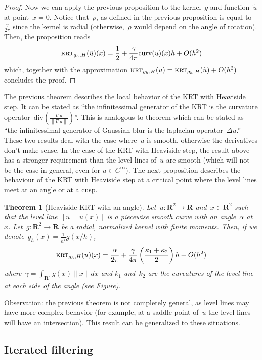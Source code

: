 \documentclass[12pt]{article}                  %
\newtheorem{theorem}{Theorem}
\begin{document}
\begin{proof}
	Now we can apply the previous proposition to the kernel~$g$ and
	function~$\tilde u$ at point~$x=0$.  Notice that~$\rho$, as defined in the
	previous proposition is equal to~$\frac{\gamma}{2\pi}$ since the kernel is
	radial (otherwise,~$\rho$ would depend on the angle of rotation).  Then, the
	proposition reads
	\[
		\textsc{krt}_{g_h,H}(\tilde
		u)(x)=\frac12+\frac{\gamma}{4\pi}\mathrm{curv}(u)(x)h + O(h^2)
	\]
	which, together with the approximation
	\(
		\textsc{krt}_{g_h,H}(u)=\textsc{krt}_{g_h,H}(\tilde u)+O(h^2)
	\)
	concludes the proof.
\end{proof}

The previous theorem %
describes the local behavior of the KRT with Heaviside step.
It can be stated as ``the infinitessimal generator of the KRT is the
curvature operator~$\mathrm{div}\left(\frac{\nabla u}{\left\|\nabla
u\right\|}\right)$''.
This is analogous to theorem  %
which can be stated as ``the infinitessimal generator of Gaussian blur is
the laplacian operator~$\Delta u$.''
These two results deal with the case where~$u$ is smooth, otherwise the
derivatives don't make sense.  In the case of the KRT with Heaviside step,
the result above has a stronger requirement than the level lines of~$u$ are
smooth (which will not be the case in general, even for $u\in C^\infty$).  The
next proposition describes the behaviour of the KRT with Heaviside step
at a critical point where the level lines meet at an angle or at a cusp.


\clearpage
\begin{theorem}[Heaviside KRT with an angle]
	Let~$u:\mathbf{R}^2\to\mathbf{R}$ and~$x\in\mathbf{R}^2$ such that
	the level line~$[u=u(x)]$ is a piecewise smooth curve with an
	angle~$\alpha$ at~$x$.
	Let~$g:\mathbf{R}^2\to\mathbf{R}$ be a radial,
	normalized kernel with
	finite moments.  Then, if we
	denote~$g_h(x)=\frac{1}{h^2}g(x/h)$,
	\[
		\textsc{krt}_{g_h,H}(u)(x)=\frac\alpha{2\pi}
		+
		\frac\gamma{4\pi}\left(\frac{\kappa_1+\kappa_2}2\right) h+O(h^2)
	\]
	where~$\gamma=\int_{\mathbf{R}^2}g(x)\|x\|dx$ and
	$k_1$ and~$k_2$ are the curvatures of the level line at each side of the
	angle (see Figure).
\end{theorem}

Observation: the previous theorem is not completely general, as level lines
may have more complex behavior (for example, at a saddle point of~$u$ the
level lines will have an intersection).  This result can be generalized to
these situations.


\subsection{Iterated filtering}
\end{document}
